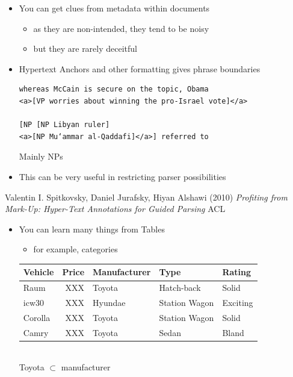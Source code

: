 \documentclass[a4paper,landscape,headrule,footrule,xetex]{foils}
\begin{document}
\begin{itemize}
\item You can get clues from metadata within documents
  \begin{itemize}
  \item as they are non-intended, they tend to be noisy
  \item but they are rarely deceitful
  \end{itemize}
\end{itemize}



\begin{itemize}
\item Hypertext Anchors and other formatting gives phrase boundaries
\begin{verbatim}
whereas McCain is secure on the topic, Obama
<a>[VP worries about winning the pro-Israel vote]</a>

[NP [NP Libyan ruler]
<a>[NP Mu‘ammar al-Qaddafi]</a>] referred to
\end{verbatim}
  Mainly NPs 
\item This can be very useful in restricting parser possibilities
\end{itemize}


Valentin I. Spitkovsky, Daniel Jurafsky, Hiyan Alshawi (2010) \textit{Profiting from Mark-Up: Hyper-Text Annotations for Guided Parsing} ACL


\MyLogo{}
 \begin{itemize}
 \item You can learn many things from Tables
   \begin{itemize}
   \item for example, categories
   \end{itemize}
   \begin{tabular}{lrlll}
     \textbf{Vehicle} & \textbf{Price} & \textbf{Manufacturer} & \textbf{Type} & \textbf{Rating} \\
     \hline
     Raum & XXX & Toyota & Hatch-back & Solid \\
     icw30 & XXX & Hyundae & Station Wagon & Exciting \\
     Corolla & XXX & Toyota & Station Wagon & Solid \\
     Camry & XXX & Toyota & Sedan & Bland
   \end{tabular}
   \\[3ex] Toyota $\subset$ manufacturer
 \end{itemize}
\end{document}
